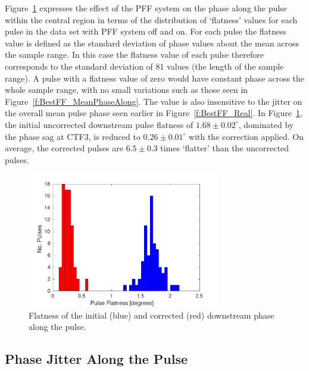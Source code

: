 Figure~\ref{f:BestFF_Flatness} expresses the effect of the PFF system on the phase along the pulse within the central region in terms of the distribution of `flatness' values for each pulse in the data set with PFF system off and on. For each pulse the flatness value is defined as the standard deviation of phase values about the mean across the sample range. In this case the flatness value of each pulse therefore corresponds to the standard deviation of 81 values (the length of the sample range). A pulse with a flatness value of zero would have constant phase across the whole sample range, with no small variations such as those seen in Figure~\ref{f:BestFF_MeanPhaseAlong}. The value is also insensitive to the jitter on the overall mean pulse phase seen earlier in Figure~\ref{f:BestFF_Real}. In Figure~\ref{f:BestFF_Flatness}, the initial uncorrected downstream pulse flatness of \(1.68\pm0.02^\circ\), dominated by the phase sag at CTF3, is reduced to \(0.26\pm0.01^\circ\) with the correction applied. On average, the corrected pulses are \(6.5\pm0.3\) times `flatter' than the uncorrected pulses.

\begin{figure}
  \centering
  \includegraphics[width=0.75\textwidth]{Figures/feedforward/BestFF_Flatness}
  \caption{Flatness of the initial (blue) and corrected (red) downstream phase along the pulse.}
  \label{f:BestFF_Flatness}
\end{figure}

\subsection{Phase Jitter Along the Pulse}
\label{ss:bestJitterAlong}


